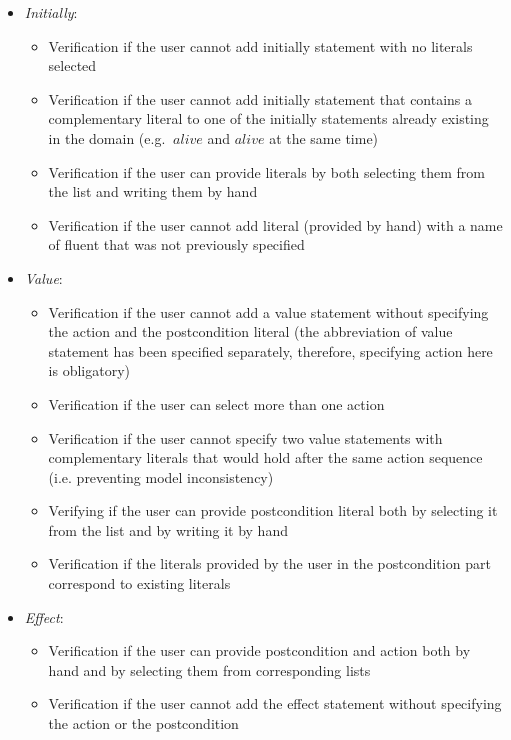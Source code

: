 \documentclass[a4paper]{article}
\begin{document}
\begin{enumerate}
\begin{enumerate}
        \begin{itemize}
            \item \textit{Initially}:
            \begin{itemize}
                \item Verification if the user cannot add initially statement with no literals selected
                \item Verification if the user cannot add initially statement that contains a complementary literal to one of the initially statements already existing in the domain (e.g. $~alive$ and $alive$ at the same time)
                \item Verification if the user can provide literals by both selecting them from the list and writing them by hand
                \item Verification if the user cannot add literal (provided by hand) with a name of fluent that was not previously specified
            \end{itemize}
            \item \textit{Value}:
            \begin{itemize}
                \item Verification if the user cannot add a value statement without specifying the action and the postcondition literal
                (the abbreviation of value statement has been specified separately, therefore, specifying action here is obligatory)
                \item Verification if the user can select more than one action
                \item Verification if the user cannot specify two value statements with complementary literals that would hold after the same action sequence (i.e. preventing model inconsistency)
                \item Verifying if the user can provide postcondition literal both by selecting it from the list and by writing it by hand
                \item Verification if the literals provided by the user in the postcondition part correspond to existing literals
            \end{itemize}
            \item \textit{Effect}:
            \begin{itemize}
                \item Verification if the user can provide postcondition and action both by hand and by selecting them from corresponding lists
                \item Verification if the user cannot add the effect statement without specifying the action or the postcondition

\end{itemize}
\end{itemize}
\end{enumerate}
\end{enumerate}
\end{document}
